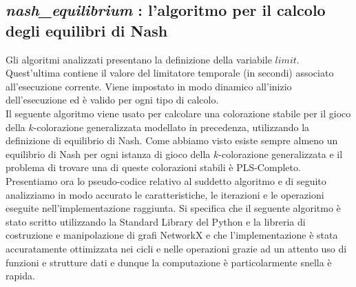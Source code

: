 \subsection{\textit{nash\_equilibrium} : l'algoritmo per il calcolo degli equilibri di Nash}
\justify
Gli algoritmi analizzati presentano la definizione della variabile $limit$. Quest'ultima contiene il valore del limitatore temporale (in secondi) associato all'esecuzione corrente. Viene impostato in modo dinamico all'inizio dell'esecuzione ed è valido per ogni tipo di calcolo.\\
Il seguente algoritmo viene usato per calcolare una colorazione stabile per il gioco della \(k\)-colorazione generalizzata modellato in precedenza, utilizzando la definizione di equilibrio di Nash. Come abbiamo visto esiste sempre almeno un equilibrio di Nash per ogni istanza di gioco della \(k\)-colorazione generalizzata e il problema di trovare una di queste colorazioni stabili è PLS-Completo. Presentiamo ora lo pseudo-codice relativo al suddetto algoritmo e di seguito analizziamo in modo accurato le caratteristiche, le iterazioni e le operazioni eseguite nell'implementazione raggiunta. Si specifica che il seguente algoritmo è stato scritto utilizzando la Standard Library del Python e la libreria di costruzione e manipolazione di grafi NetworkX e che l'implementazione è stata accuratamente ottimizzata nei cicli e nelle operazioni grazie ad un attento uso di funzioni e strutture dati e dunque la computazione è particolarmente snella è rapida.

